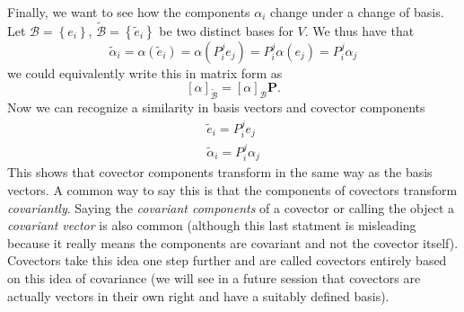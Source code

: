 \documentclass[a4paper]{article}
\begin{document}
Finally, we want to see how the components $\alpha_i$ change under a change of basis. Let $\mathcal{B} = \left\{ e_i \right\}$, $\widetilde{\mathcal{B}} = \left\{ \tilde{e}_i \right\}$ be two distinct bases for $V$. We thus have that
\[
  \tilde{\alpha}_i = \alpha(\tilde{e}_i) = \alpha(P_i^j e_j) = P_i^j \alpha(e_j) = P_i^j \alpha_j
\]
we could equivalently write this in matrix form as
\[
  \left[ \alpha \right]_{\tilde{\mathcal{B}}} = \left[ \alpha \right]_{\mathcal{B}}\bm{P}.
\]
Now we can recognize a similarity in basis vectors and covector components
\[
  \begin{aligned}
    \tilde{e}_i = P_i^je_j \\
    \tilde{\alpha}_i = P_i^j\alpha_j 
  \end{aligned}
\]
This shows that covector components transform in the same way as the basis vectors. A common way to say this is that the components of covectors transform \textit{covariantly}. Saying the \textit{covariant components} of a covector or calling the object a \textit{covariant vector} is also common (although this last statment is misleading because it really means the components are covariant and not the covector itself). Covectors take this idea one step further and are called covectors entirely based on this idea of covariance (we will see in a future session that covectors are actually vectors in their own right and have a suitably defined basis).
\end{document}
